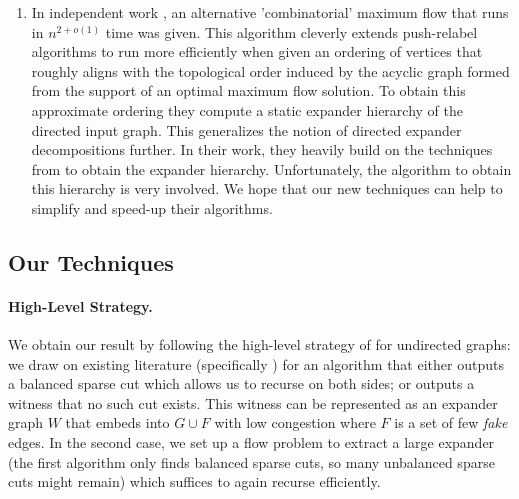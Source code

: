 \documentclass[11pt]{article}
\begin{document}
\begin{enumerate}
    \item In independent work \cite{bernstein2024maximum}, an alternative 'combinatorial' maximum flow that runs in $n^{2+o(1)}$ time was given. This algorithm cleverly extends push-relabel algorithms to run more efficiently when given an ordering of vertices that roughly aligns with the topological order induced by the acyclic graph formed from the support of an optimal maximum flow solution. To obtain this approximate ordering they compute a static expander hierarchy of the directed input graph. This generalizes the notion of directed expander decompositions further. In their work, they heavily build on the techniques from \cite{hua2023maintaining} to obtain the expander hierarchy. Unfortunately, the algorithm to obtain this hierarchy is very involved. We hope that our new techniques can help to simplify and speed-up their algorithms.    
\end{enumerate}







\subsection{Our Techniques} 

\paragraph{High-Level Strategy.} We obtain our result by following the high-level strategy of \cite{saranurak2019expander} for undirected graphs: we draw on existing literature (specifically \cite{khandekar2009graph, louis2010cut}) for an algorithm that either outputs a balanced sparse cut which allows us to recurse on both sides; or outputs a witness that no such cut exists. This witness can be represented as an expander graph $W$ that embeds into $G \cup F$ with low congestion where $F$ is a set of few \emph{fake} edges. In the second case, we set up a flow problem to extract a large expander (the first algorithm only finds balanced sparse cuts, so many unbalanced sparse cuts might remain) which suffices to again recurse efficiently. 
\end{document}
